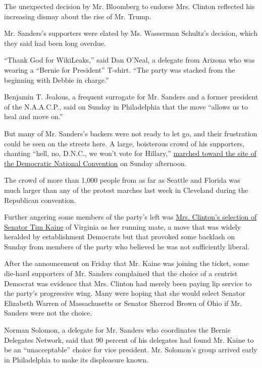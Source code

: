 The unexpected decision by Mr. Bloomberg to endorse Mrs. Clinton
reflected his increasing dismay about the rise of Mr. Trump.

Mr. Sanders's supporters were elated by Ms. Wasserman Schultz's
decision, which they said had been long overdue.

``Thank God for WikiLeaks,'' said Dan O'Neal, a delegate from Arizona
who was wearing a ``Bernie for President'' T-shirt. ``The party was
stacked from the beginning with Debbie in charge.''

Benjamin T. Jealous, a frequent surrogate for Mr. Sanders and a former
president of the N.A.A.C.P., said on Sunday in Philadelphia that the
move ``allows us to heal and move on.''

But many of Mr. Sanders's backers were not ready to let go, and their
frustration could be seen on the streets here. A large, boisterous crowd
of his supporters, chanting ``hell, no, D.N.C., we won't vote for
Hillary,''
\href{http://www.nytimes.com/2016/07/25/us/politics/protests-convention-bernie-sanders-philadelphia.html}{marched
toward the site of the Democratic National Convention} on Sunday
afternoon.

The crowd of more than 1,000 people from as far as Seattle and Florida
was much larger than any of the protest marches last week in Cleveland
during the Republican convention.

Further angering some members of the party's left was
\href{http://www.nytimes.com/2016/07/23/us/politics/tim-kaine-hillary-clinton-vice-president.html?action=click\&contentCollection=Politics\&module=RelatedCoverage\&region=Marginalia\&pgtype=article}{Mrs.
Clinton's selection of Senator Tim Kaine} of Virginia as her running
mate, a move that was widely heralded by establishment Democrats but
that provoked some backlash on Sunday from members of the party who
believed he was not sufficiently liberal.

After the announcement on Friday that Mr. Kaine was joining the ticket,
some die-hard supporters of Mr. Sanders complained that the choice of a
centrist Democrat was evidence that Mrs. Clinton had merely been paying
lip service to the party's progressive wing. Many were hoping that she
would select Senator Elizabeth Warren of Massachusetts or Senator
Sherrod Brown of Ohio if Mr. Sanders were not the choice.

Norman Solomon, a delegate for Mr. Sanders who coordinates the Bernie
Delegates Network, said that 90 percent of his delegates had found Mr.
Kaine to be an ``unacceptable'' choice for vice president. Mr. Solomon's
group arrived early in Philadelphia to make its displeasure known.

